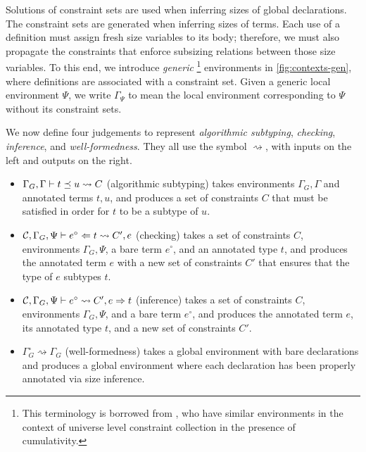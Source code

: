 Solutions of constraint sets are used when inferring sizes of global declarations.
The constraint sets are generated when inferring sizes of terms.
Each use of a definition must assign fresh size variables to its body; therefore, we must also propagate the constraints that enforce subsizing relations between those size variables.
To this end, we introduce \emph{generic}%
\footnote{This terminology is borrowed from \citet{universes}, who have similar environments in the context of universe level constraint collection in the presence of cumulativity.}
environments in \autoref{fig:contexts-gen}, where definitions are associated with a constraint set.
Given a generic local environment $\Psi$, we write $\Gamma_{\Psi}$ to mean the local environment corresponding to $\Psi$ without its constraint sets.

We now define four judgements to represent \emph{algorithmic subtyping}, \emph{checking}, \emph{inference}, and \emph{well-formed\-ness}.
They all use the symbol $\rightsquigarrow$, with inputs on the left and outputs on the right.
\begin{itemize}
  \item $\Gamma_G, \Gamma \vdash t \preceq u \rightsquigarrow C$ (algorithmic subtyping) takes environments $\Gamma_G, \Gamma$ and annotated terms $t, u$, and produces a set of constraints $C$ that must be satisfied in order for $t$ to be a subtype of $u$.
  \item $\mathcal{C}, \Gamma_G, \Psi \vdash e^\circ \Leftarrow t \rightsquigarrow C', e$ (checking) takes a set of constraints $C$, environments $\Gamma_G, \Psi$, a bare term $e^\circ$, and an annotated type $t$, and produces the annotated term $e$ with a new set of constraints $C'$ that ensures that the type of $e$ subtypes $t$.
  \item $\mathcal{C}, \Gamma_G, \Psi \vdash e^\circ \rightsquigarrow C', e \Rightarrow t$ (inference) takes a set of constraints $C$, environments $\Gamma_G, \Psi$, and a bare term $e^\circ$, and produces the annotated term $e$, its annotated type $t$, and a new set of constraints $C'$.
  \item $\Gamma_G^\circ \rightsquigarrow \Gamma_G$ (well-formedness) takes a global environment with bare declarations and produces a global environment where each declaration has been properly annotated via size inference.
\end{itemize}

